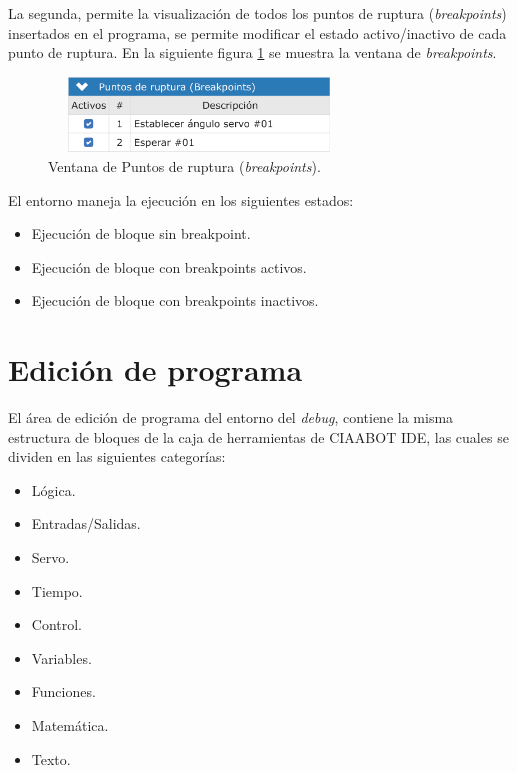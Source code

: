 La segunda, permite la visualización de todos los puntos de ruptura (\emph{breakpoints}) insertados en el programa, se permite modificar el estado activo/inactivo de cada punto de ruptura. En la siguiente figura \ref{fig:ventana} se muestra la ventana de \emph{breakpoints}.

\begin{figure}[!htbp]
	\centering
	\includegraphics*[width=8cm,height=2cm]{./Figures/breakpoints.PNG}
	\caption{Ventana de Puntos de ruptura (\emph{breakpoints}).}
	\par\label{fig:ventana}
\end{figure}

El entorno maneja la ejecución en los siguientes estados:

\begin{itemize}
	\item Ejecución de bloque sin breakpoint.
	\item Ejecución de bloque con breakpoints activos.	
	\item Ejecución de bloque con breakpoints inactivos.
\end{itemize}


\section{Edición de programa}
\label{sec:Edición de programa}

El área de edición de programa del entorno del \emph{debug}, contiene la misma estructura de bloques de la caja de herramientas de CIAABOT IDE, las cuales se dividen en las siguientes categorías:

\begin{itemize}
	\item Lógica.
	\item Entradas/Salidas.	
	\item Servo.
	\item Tiempo.
	\item Control.
	\item Variables.
	\item Funciones.
	\item Matemática.
	\item Texto.
\end{itemize}

